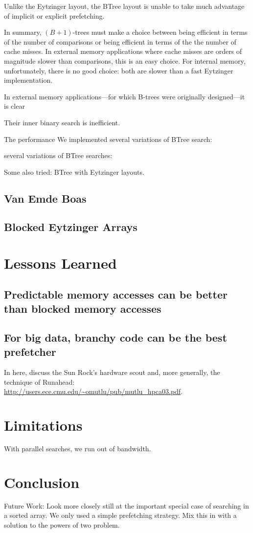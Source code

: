 \documentclass{patmorin}
\begin{document}
Unlike the Eytzinger layout, the BTree layout is unable to take much
advantage of implicit or explicit prefetching.  

In summary, $(B+1)$-trees must make a choice between being efficient in
terms of the number of comparisons or being efficient in terms of the
the number of cache misses.  In external memory applications where cache
misses are orders of magnitude slower than comparisons, this is an easy
choice. For internal memory, unfortunately, there is no good choice:
both are slower than a fast Eytzinger implementation.


In external memory applications---for which B-trees were originally designed---it is clear


Their inner binary search is inefficient.


The performance
We implemented several variations of BTree search:

several variations of BTree searches:

Some also tried:  BTree with Eytzinger layouts.

\subsection{Van Emde Boas}


\subsection{Blocked Eytzinger Arrays}


\section{Lessons Learned}

\subsection{Predictable memory accesses can be better than blocked
            memory accesses}

\subsection{For big data, branchy code can be the best prefetcher}

In here, discuss the Sun Rock's hardware scout and, more generally, the technique of Runahead: \url{http://users.ece.cmu.edu/~omutlu/pub/mutlu_hpca03.pdf}.

\section{Limitations}

With parallel searches, we run out of bandwidth.

\section{Conclusion}

Future Work: Look more closely still at the important special case of searching
in a sorted array. We only used a simple prefetching strategy. Mix this
in with a solution to the powers of two problem.
\end{document}
